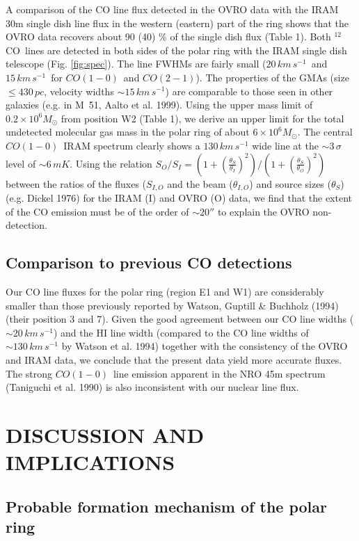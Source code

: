 \documentclass{aastex}
\newcommand{\CO}{$^{12}$CO}
\newcommand{\COe}{$CO(1-0)$}
\newcommand{\COz}{$CO(2-1)$}
\newcommand{\kms}{km\,s^{-1}}
\newcommand{\solm}{M_{\odot}}
\begin{document}
A comparison of the CO line flux detected in the OVRO data with the
IRAM 30m single dish line flux in the western (eastern) part of the
ring shows that the OVRO data recovers about 90 (40) \% of the single
dish flux (Table 1). Both \CO\ lines are detected in both sides of the
polar ring with the IRAM single dish telescope
(Fig. \ref{fig:spec}). The line FWHMs are fairly small ($20\,\kms$\
and $15\,\kms$\ for \COe\ and \COz). The properties of the GMAs (size
$\le 430\,pc$, velocity widths $\sim 15\,\kms$) are comparable to
those seen in other galaxies (e.g. in M~51, Aalto et al. 1999).  Using
the upper mass limit of $0.2\times10^6\solm$ from position W2 (Table
1), we derive an upper limit for the total undetected molecular gas
mass in the polar ring of about $6\times10^6\solm$. The central \COe\
IRAM spectrum clearly shows a $130\,\kms$ wide line at the $\sim
3\,\sigma$ level of $\sim 6\,mK$.  Using the relation
$S_O/S_I=(1+(\frac{\theta_S}{\theta_I})^2)/(1+(\frac{\theta_S}{\theta_O})^2)$
between the ratios of the fluxes ($S_{I,O}$ and the beam
($\theta_{I,O}$) and source sizes ($\theta_{S}$) (e.g. Dickel 1976)
for the IRAM (I) and OVRO (O) data, we find that the extent of the CO
emission must be of the order of $\sim 20''$ to explain the OVRO
non-detection.

\subsection{Comparison to previous CO detections}

Our CO line fluxes for the polar ring (region E1 and W1) are
considerably smaller than those previously reported by Watson, Guptill
\& Buchholz (1994) (their position 3 and 7). Given the good agreement
between our CO line widths ($\sim 20\,\kms$) and the HI line width
(compared to the CO line widths of $\sim 130\,\kms$ by Watson et
al. 1994) together with the consistency of the OVRO and IRAM data, we
conclude that the present data yield more accurate fluxes. The strong
\COe\ line emission apparent in the NRO 45m spectrum (Taniguchi et
al. 1990) is also inconsistent with our nuclear line flux.

\section{DISCUSSION AND IMPLICATIONS}

\subsection{Probable formation mechanism of the polar ring}
\end{document}
